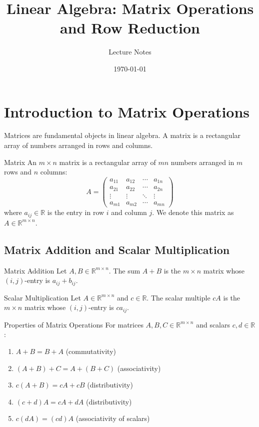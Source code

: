 \documentclass[12pt,a4paper]{article}
\title{\textbf{Linear Algebra: Matrix Operations and Row Reduction}}
\author{Lecture Notes}
\date{\today}
\newcommand{\R}{\mathbb{R}}
\begin{document}
	
	\maketitle
	
	\tableofcontents
	
	\newpage
	
	\section{Introduction to Matrix Operations}
	
	Matrices are fundamental objects in linear algebra. A matrix is a rectangular array of numbers arranged in rows and columns.
	
	\begin{definition}{Matrix}
		An $m \times n$ matrix is a rectangular array of $mn$ numbers arranged in $m$ rows and $n$ columns:
		\[
		A = \begin{pmatrix}
			a_{11} & a_{12} & \cdots & a_{1n} \\
			a_{21} & a_{22} & \cdots & a_{2n} \\
			\vdots & \vdots & \ddots & \vdots \\
			a_{m1} & a_{m2} & \cdots & a_{mn}
		\end{pmatrix}
		\]
		where $a_{ij} \in \R$ is the entry in row $i$ and column $j$. We denote this matrix as $A \in \R^{m \times n}$.
	\end{definition}
	
	\subsection{Matrix Addition and Scalar Multiplication}
	
	\begin{definition}{Matrix Addition}
		Let $A, B \in \R^{m \times n}$. The sum $A + B$ is the $m \times n$ matrix whose $(i,j)$-entry is $a_{ij} + b_{ij}$.
	\end{definition}
	
	\begin{definition}{Scalar Multiplication}
		Let $A \in \R^{m \times n}$ and $c \in \R$. The scalar multiple $cA$ is the $m \times n$ matrix whose $(i,j)$-entry is $ca_{ij}$.
	\end{definition}
	
	\begin{proposition}{Properties of Matrix Operations}
		For matrices $A, B, C \in \R^{m \times n}$ and scalars $c, d \in \R$:
		\begin{enumerate}[label=(\roman*)]
			\item $A + B = B + A$ (commutativity)
			\item $(A + B) + C = A + (B + C)$ (associativity)
			\item $c(A + B) = cA + cB$ (distributivity)
			\item $(c + d)A = cA + dA$ (distributivity)
			\item $c(dA) = (cd)A$ (associativity of scalars)
		\end{enumerate}
	\end{proposition}
	
\end{document}
